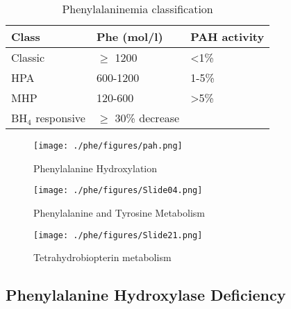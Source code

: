 \documentclass{scrartcl}
\begin{document}
\begin{table}[htbp]
\caption{\label{tab:org138693c}
Phenylalaninemia classification}
\centering
\begin{tabular}{lll}
Class & Phe (\textmu{}mol/l) & PAH activity\\
\hline
Classic & \(\ge\) 1200 & \textless{}1\%\\
HPA & 600-1200 & 1-5\%\\
MHP & 120-600 & \textgreater{}5\%\\
BH\(_{\text{4}}\) responsive & \(\ge\) 30\% decrease & \\
\end{tabular}
\end{table}

\begin{figure}[htbp]
\centering
\texttt{[image: ./phe/figures/pah.png]}
\caption{\label{fig:orged3a1d1}
Phenylalanine Hydroxylation}
\end{figure}

\begin{figure}[htbp]
\centering
\texttt{[image: ./phe/figures/Slide04.png]}
\caption{\label{fig:org0aa6aba}
Phenylalanine and Tyrosine Metabolism}
\end{figure}

\begin{figure}[htbp]
\centering
\texttt{[image: ./phe/figures/Slide21.png]}
\caption{\label{fig:orgae14db3}
Tetrahydrobiopterin metabolism}
\end{figure}


\subsection{Phenylalanine Hydroxylase Deficiency}
\label{sec:org571e0a4}
\end{document}
